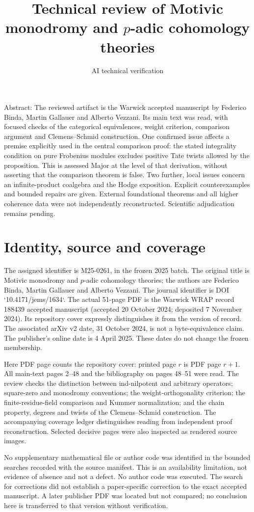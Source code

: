 \documentclass[10pt]{article}
\title{Technical review of
Motivic monodromy and \(p\)-adic cohomology theories}
\author{AI technical verification}
\date{}
\begin{document}
\maketitle
Abstract: The reviewed artifact is the Warwick accepted manuscript by Federico Binda, Martin Gallauer and Alberto Vezzani. Its main text was read, with focused checks of the categorical equivalences, weight criterion, comparison argument and Clemens–Schmid construction. One confirmed issue affects a premise explicitly used in the central comparison proof: the stated integrality condition on pure Frobenius modules excludes positive Tate twists allowed by the proposition. This is assessed Major at the level of that derivation, without asserting that the comparison theorem is false. Two further, local issues concern an infinite-product coalgebra and the Hodge exposition. Explicit counterexamples and bounded repairs are given. External foundational theorems and all higher coherence data were not independently reconstructed. Scientific adjudication remains pending.\par
\section*{Identity, source and coverage}
The assigned identifier is M25-0261, in the frozen 2025 batch. The original title is Motivic monodromy and \(p\)-adic cohomology theories; the authors are Federico Binda, Martin Gallauer and Alberto Vezzani. The journal identifier is DOI `10.4171/jems/1634`. The actual 51-page PDF is the Warwick WRAP record 188439 accepted manuscript (accepted 20 October 2024; deposited 7 November 2024). Its repository cover expressly distinguishes it from the version of record. The associated arXiv v2 date, 31 October 2024, is not a byte-equivalence claim. The publisher’s online date is 4 April 2025. These dates do not change the frozen membership.\par
Here PDF page counts the repository cover: printed page \(r\) is PDF page \(r+1\). All main-text pages 2–48 and the bibliography on pages 48–51 were read. The review checks the distinction between ind-nilpotent and arbitrary operators; square-zero and monodromy conventions; the weight-orthogonality criterion; the finite-residue-field comparison and Kummer normalization; and the chain property, degrees and twists of the Clemens–Schmid construction. The accompanying coverage ledger distinguishes reading from independent proof reconstruction. Selected decisive pages were also inspected as rendered source images.\par
No supplementary mathematical file or author code was identified in the bounded searches recorded with the source manifest. This is an availability limitation, not evidence of absence and not a defect. No author code was executed. The search for corrections did not establish a paper-specific correction to the exact accepted manuscript. A later publisher PDF was located but not compared; no conclusion here is transferred to that version without verification.\par
\end{document}
